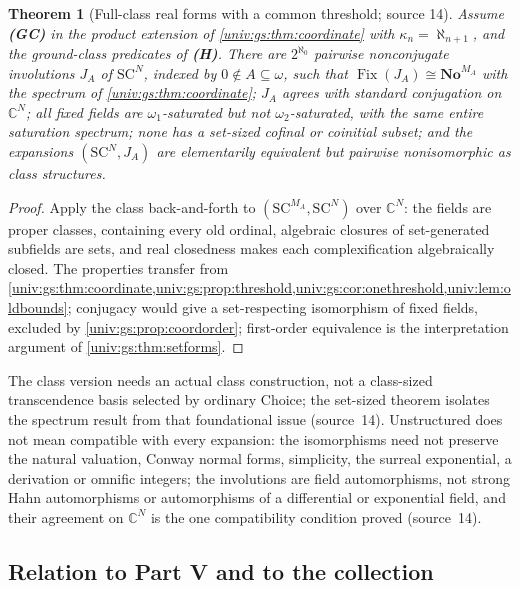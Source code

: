 \documentclass[11pt,letterpaper]{article}
\numberwithin{equation}{section}
\newtheorem{theorem}{Theorem}[section]
\theoremstyle{definition}
\theoremstyle{remark}
\newcommand{\No}{\mathbf{No}}
\newcommand{\SC}{\mathrm{SC}}
\newcommand{\SCN}{\SC^{N}}
\newcommand{\C}{\mathbb C}
\newcommand{\Fix}{\operatorname{Fix}}
\begin{document}
\begin{theorem}[Full-class real forms with a common threshold; source 14]\label{univ:gs:thm:classinvolutions}
Assume \textbf{(GC)} in the product extension of \cref{univ:gs:thm:coordinate} with
$\kappa_n=\aleph_{n+1}$, and the ground-class predicates of \textbf{(H)}. There are $2^{\aleph_0}$
pairwise nonconjugate involutions $J_A$ of $\SCN$, indexed by $0\notin A\subseteq\omega$, such that
$\Fix(J_A)\cong\No^{M_A}$ with the spectrum of \cref{univ:gs:thm:coordinate}; $J_A$ agrees with
standard conjugation on $\C^N$; all fixed fields are $\omega_1$-saturated but not
$\omega_2$-saturated, with the same entire saturation spectrum; none has a set-sized cofinal or
coinitial subset; and the expansions $(\SCN,J_A)$ are elementarily equivalent but pairwise
nonisomorphic as class structures.
\end{theorem}
\begin{proof}
Apply the class back-and-forth to $(\SC^{M_A},\SCN)$ over $\C^N$: the fields are proper classes,
containing every old ordinal, algebraic closures of set-generated subfields are sets, and real
closedness makes each complexification algebraically closed. The properties transfer from
\cref{univ:gs:thm:coordinate,univ:gs:prop:threshold,univ:gs:cor:onethreshold,univ:lem:oldbounds};
conjugacy would give a set-respecting isomorphism of fixed fields, excluded by
\cref{univ:gs:prop:coordorder}; first-order equivalence is the interpretation argument of
\cref{univ:gs:thm:setforms}.
\end{proof}

The class version needs an actual class construction, not a class-sized transcendence basis selected
by ordinary Choice; the set-sized theorem isolates the spectrum result from that foundational issue
(source~14). Unstructured does not mean compatible with every expansion: the isomorphisms need not
preserve the natural valuation, Conway normal forms, simplicity, the surreal exponential, a
derivation or omnific integers; the involutions are field automorphisms, not strong Hahn
automorphisms or automorphisms of a differential or exponential field, and their agreement on
$\C^N$ is the one compatibility condition proved (source~14).

\subsection{Relation to Part V and to the collection}
\end{document}
